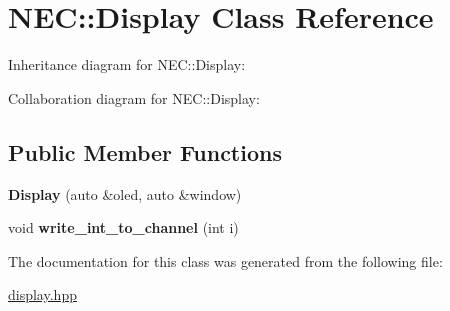 \hypertarget{classNEC_1_1Display}{}\section{N\+EC\+:\+:Display Class Reference}
\label{classNEC_1_1Display}


Inheritance diagram for N\+EC\+:\+:Display\+:


Collaboration diagram for N\+EC\+:\+:Display\+:
\subsection*{Public Member Functions}
\begin{DoxyCompactItemize}
\item 
\mbox{\label{classNEC_1_1Display_ac6372301d5435f62b653521bc4abac3d}} 
{\bfseries Display} (auto \&oled, auto \&window)
\item 
\mbox{\label{classNEC_1_1Display_a152d00a5af6453bdfc32ca9619f819a7}} 
void {\bfseries write\+\_\+int\+\_\+to\+\_\+channel} (int i)
\end{DoxyCompactItemize}


The documentation for this class was generated from the following file\+:\begin{DoxyCompactItemize}
\item 
\hyperlink{display_8hpp}{display.\+hpp}\end{DoxyCompactItemize}
